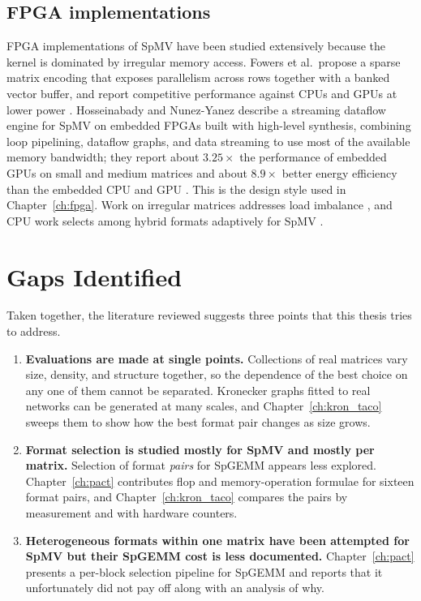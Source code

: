 \subsection{FPGA implementations}
FPGA implementations of SpMV have been studied extensively because the kernel is dominated by irregular memory access. Fowers et al.\ propose a sparse matrix encoding that exposes parallelism across rows together with a banked vector buffer, and report competitive performance against CPUs and GPUs at lower power \cite{fowers2014fpga}. Hosseinabady and Nunez-Yanez describe a streaming dataflow engine for SpMV on embedded FPGAs built with high-level synthesis, combining loop pipelining, dataflow graphs, and data streaming to use most of the available memory bandwidth; they report about $3.25\times$ the performance of embedded GPUs on small and medium matrices and about $8.9\times$ better energy efficiency than the embedded CPU and GPU \cite{fpga-stream}. This is the design style used in Chapter~\ref{ch:fpga}. Work on irregular matrices addresses load imbalance \cite{overcoming-irreg}, and CPU work selects among hybrid formats adaptively for SpMV \cite{hybrid_format}.

\section{Gaps Identified}
\label{sec:lit-gaps}

Taken together, the literature reviewed suggests three points that this thesis tries to address.
\begin{enumerate}
  \item \textbf{Evaluations are made at single points.} Collections of real matrices vary size, density, and structure together, so the dependence of the best choice on any one of them cannot be separated. Kronecker graphs fitted to real networks can be generated at many scales, and Chapter~\ref{ch:kron_taco} sweeps them to show how the best format pair changes as size grows.
  \item \textbf{Format selection is studied mostly for SpMV and mostly per matrix.} Selection of format \emph{pairs} for SpGEMM appears less explored. Chapter~\ref{ch:pact} contributes flop and memory-operation formulae for sixteen format pairs, and Chapter~\ref{ch:kron_taco} compares the pairs by measurement and with hardware counters.
  \item \textbf{Heterogeneous formats within one matrix have been attempted for SpMV but their SpGEMM cost is less documented.} Chapter~\ref{ch:pact} presents a per-block selection pipeline for SpGEMM and reports that it unfortunately did not pay off along with an analysis of why.
\end{enumerate}
